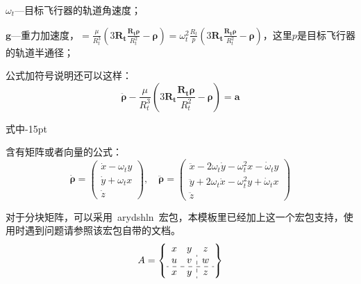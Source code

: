 $\omega_{t}$---目标飞行器的轨道角速度；

$\mathbf{g}$---重力加速度，$=\frac{\mu}{R_{t}^{3}}\left(
3\mathbf{R_{t}}\frac{\mathbf{R_{t}\rho}}{R_{t}^{2}}-\boldsymbol{\rho}\right)=\omega_{t}^{2}\frac{R_{t}}{p}\left(
3\mathbf{R_{t}}\frac{\mathbf{R_{t}\rho}}{R_{t}^{2}}-\boldsymbol{\rho}\right)$，这里$p$是目标飞行器的轨道半通径；

公式加符号说明还可以这样：
\begin{equation}\label{eq:111}
\ddot{\boldsymbol{\rho}}-\frac{\mu}{R_{t}^{3}}\left( 3\mathbf{R_{t}}\frac{\mathbf{R_{t}\rho}}{R_{t}^{2}}-\boldsymbol{\rho}\right)=\mathbf{a}
\end{equation}
\begin{formulasymb}{式中}{-15pt}%
\end{formulasymb}

含有矩阵或者向量的公式：
\begin{equation}\label{eq:rho}
\dot{\boldsymbol{\rho}}=\left( \begin{array}{c}
\dot{x}-\omega_{t}y\\\dot{y}+\omega_{t}x\\\dot{z}
\end{array}\right) , \quad
\ddot{\boldsymbol{\rho}}=\left( \begin{array}{c}
\ddot{x}-2\omega_{t}\dot{y}-\omega_{t}^{2}x-\dot{\omega}_{t}y\\
\ddot{y}+2\omega_{t}\dot{x}-\omega_{t}^{2}y+\dot{\omega}_{t}x\\
\ddot{z}
\end{array}\right)
\end{equation}

对于分块矩阵，可以采用~arydshln~宏包，本模板里已经加上这一个宏包支持，使用时遇到问题请参照该宏包自带的文档。
\begin{equation}
A = \left\{ \begin{array}{cc:c} %
 x & y & z \\
 u & v & w \\ \hdashline   %
 x & y & z
 \end{array} \right\}
 \end{equation}


